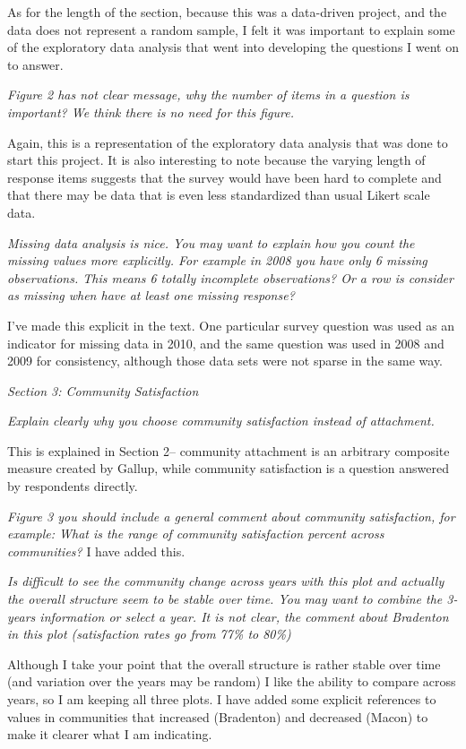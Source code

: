 \documentclass[12pt]{article}
\begin{document}
As for the length of the section, because this was a data-driven project, and the data does not represent a random sample, I felt it was important to explain some of the exploratory data analysis that went into developing the questions I went on to answer. 

\emph{Figure 2 has not clear message, why the number of items in a question is important? We think there is no need for this figure.}

Again, this is a representation of the exploratory data analysis that was done to start this project. It is also interesting to note because the varying length of response items suggests that the survey would have been hard to complete and that there may be data that is even less standardized than usual Likert scale data. 

\emph{Missing data analysis is nice. You may want to explain how you count the missing values more explicitly. For example in 2008 you have only 6 missing observations. This means 6 totally incomplete observations? Or a row is consider as missing when have at least one missing response?}

I've made this explicit in the text. One particular survey question was used as an indicator for missing data in 2010, and the same question was used in 2008 and 2009 for consistency, although those data sets were not sparse in the same way. 

\emph{Section 3: Community Satisfaction}

\emph{Explain clearly why you choose community satisfaction instead of attachment.}

This is explained in Section 2-- community attachment is an arbitrary composite measure created by Gallup, while community satisfaction is a question answered by respondents directly. 

\emph{Figure 3 you should include a general comment about community satisfaction, for example: What is the range of community satisfaction percent across communities?}
I have added this. 

\emph{Is difficult to see the community change across years with this plot and actually the overall structure seem to be stable over time. You may want to combine the 3-years information or select a year. It is not clear, the comment about Bradenton in this plot (satisfaction rates go from 77\% to 80\%)}

Although I take your point that the overall structure is rather stable over time (and variation over the years may be random) I like the ability to compare across years, so I am keeping all three plots. I have added some explicit references to values in communities that increased (Bradenton) and decreased (Macon) to make it clearer what I am indicating. 
\end{document}
